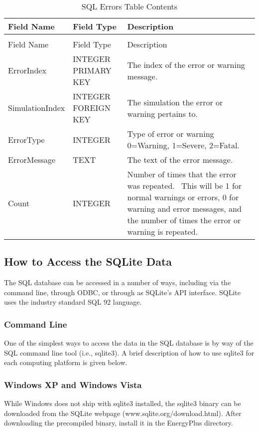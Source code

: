 \begin{longtable}[c]{p{1.5in}p{1.5in}p{2.99in}}
\caption{SQL Errors Table Contents \label{table:table-42.-sql-errors-table-contents}} \tabularnewline
\toprule 
Field Name & Field Type & Description \tabularnewline
\midrule
\endfirsthead

\caption[]{SQL Errors Table Contents} \tabularnewline
\toprule 
Field Name & Field Type & Description \tabularnewline
\midrule
\endhead

ErrorIndex & INTEGER PRIMARY KEY & The index of the error or warning message. \tabularnewline
SimulationIndex & INTEGER FOREIGN KEY & The simulation the error or warning pertains to. \tabularnewline
ErrorType & INTEGER & Type of error or warning 0=Warning, 1=Severe, 2=Fatal. \tabularnewline
ErrorMessage & TEXT & The text of the error message. \tabularnewline
Count & INTEGER & Number of times that the error was repeated.~ This will be 1 for normal warnings or errors, 0 for warning and error messages, and the number of times the error or warning is repeated. \tabularnewline
\bottomrule
\end{longtable}

\subsection{How to Access the SQLite Data}\label{how-to-access-the-sqlite-data}

The SQL database can be accessed in a number of ways, including via the command line, through ODBC, or through as SQLite's API interface. SQLite uses the industry standard SQL 92 language.

\subsubsection{Command Line}\label{command-line}

One of the simplest ways to access the data in the SQL database is by way of the SQL command line tool (i.e., sqlite3). A brief description of how to use sqlite3 for each computing platform is given below.

\subsubsection{Windows XP and Windows Vista}\label{windows-xp-and-windows-vista}

While Windows does not ship with sqlite3 installed, the sqlite3 binary can be downloaded from the SQLite webpage (www.sqlite.org/download.html). After downloading the precompiled binary, install it in the EnergyPlus directory.

